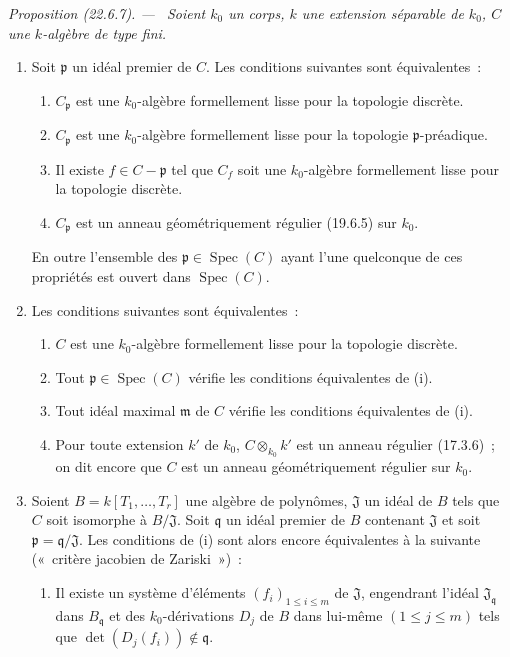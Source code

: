 \documentclass[10pt,oneside]{book}
\makeatletter
\newcommand{\setmanualcurrentlabel}[1]{\def\@currentlabel{#1}}
\newcommand{\oldpage}[2][]{%
  \setcounter{footnote}{0}%
  \marginpar{\scriptsize\textbf{#1}~|~#2}\ignorespaces}
\newenvironment{proposition}[1][]{%
  \setmanualcurrentlabel{#1}\par\medskip\noindent\itshape Proposition (#1). ---\ }{\par}
\makeatother
\begin{document}
\begin{proposition}[22.6.7]
\label{0.22.6.7-fr}
Soient $k_0$ un corps, $k$ une extension séparable de $k_0$, $C$ une
$k$-algèbre de type fini.
\begin{enumerate}
  \item[\rm(i)] Soit $\mathfrak p$ un idéal premier de $C$. Les conditions
  suivantes sont équivalentes~:
  \begin{enumerate}
    \item[a)] $C_{\mathfrak p}$ est une $k_0$-algèbre formellement lisse pour
    la topologie discrète.
    \item[b)] $C_{\mathfrak p}$ est une $k_0$-algèbre formellement lisse pour
    la topologie $\mathfrak p$-préadique.
    \item[c)] Il existe $f\in C-\mathfrak p$ tel que $C_f$ soit une
    $k_0$-algèbre formellement lisse pour la topologie discrète.
    \item[d)] $C_{\mathfrak p}$ est un anneau géométriquement régulier
    (19.6.5) sur $k_0$.
  \end{enumerate}
  En outre l'ensemble des $\mathfrak p\in\operatorname{Spec}(C)$ ayant l'une quelconque de
  ces propriétés est ouvert dans $\operatorname{Spec}(C)$.
  \item[\rm(ii)] Les conditions suivantes sont équivalentes~:
  \begin{enumerate}
    \item[a)] $C$ est une $k_0$-algèbre formellement lisse pour la topologie
    discrète.
    \item[b)] Tout $\mathfrak p\in\operatorname{Spec}(C)$ vérifie les conditions
    équivalentes de (i).
    \item[c)] Tout idéal maximal $\mathfrak m$ de $C$ vérifie les conditions
    équivalentes de (i).
    \item[d)] Pour toute extension $k'$ de $k_0$, $C\otimes_{k_0}k'$ est un
    anneau régulier (17.3.6)~; on dit encore que $C$ est un anneau
    géométriquement régulier sur $k_0$.
  \end{enumerate}

  \oldpage[0\textsubscript{IV-1}]{208}

  \item[\rm(iii)] Soient $B=k[T_1,\ldots,T_r]$ une algèbre de polynômes,
  $\mathfrak J$ un idéal de $B$ tels que $C$ soit isomorphe à
  $B/\mathfrak J$. Soit $\mathfrak q$ un idéal premier de $B$ contenant
  $\mathfrak J$ et soit $\mathfrak p=\mathfrak q/\mathfrak J$. Les conditions
  de (i) sont alors encore équivalentes à la suivante («~critère jacobien de
  Zariski~»)~:
  \begin{enumerate}
    \item[e)] Il existe un système d'éléments
    $(f_i)_{1\leq i\leq m}$ de $\mathfrak J$, engendrant l'idéal
    $\mathfrak J_{\mathfrak q}$ dans $B_{\mathfrak q}$ et des
    $k_0$-dérivations $D_j$ de $B$ dans lui-même $(1\leq j\leq m)$ tels que
    $\det(D_j(f_i))\notin\mathfrak q$.
  \end{enumerate}
\end{enumerate}
\end{proposition}
\end{document}
